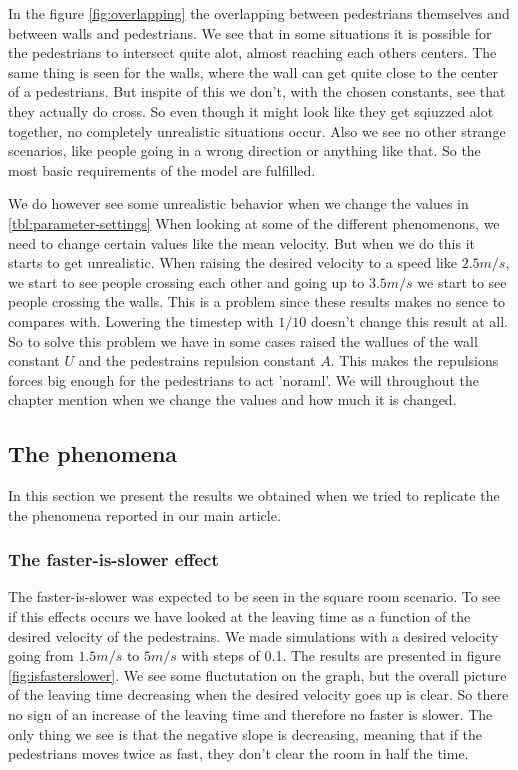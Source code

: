 In the figure \ref{fig:overlapping} the overlapping between pedestrians
themselves and between walls and pedestrians. We see that in some situations
it is possible for the pedestrians to intersect quite alot, almost reaching
each others centers. The same thing is seen for the walls, where the wall
can get quite close to the center of a pedestrians. But inspite of this
we don't, with the chosen constants, see that they actually do cross. So
even though it might look like they get sqiuzzed alot together, no completely
unrealistic situations occur. Also we see no other strange scenarios, like
people going in a wrong direction or anything like that. So the most basic
requirements of the model are fulfilled.

We do however see some unrealistic behavior when we change the values in
\ref{tbl:parameter-settings} When looking at some of the different phenomenons,
we need to change certain values like the mean velocity. But when we do
this it starts to get unrealistic. When raising the desired velocity to
a speed like $2.5m/s$, we start to see people crossing each other and going
up to $3.5m/s$ we start to see people crossing the walls. This is a problem
since these results makes no sence to compares with. Lowering the timestep
with $1/10$ doesn't change this result at all. So to solve this problem we
have in some cases raised the wallues of the wall constant $U$ and the
pedestrains repulsion constant $A$. This makes the repulsions forces
big enough for the pedestrians to act 'noraml'. We will throughout the
chapter mention when we change the values and how much it is changed.

\subsection{The phenomena}\label{subsec:ThePhenomena}
In this section we present the results we obtained when we
tried to replicate the the phenomena reported in our main
article.

\subsubsection{The faster-is-slower effect}
The faster-is-slower was expected to be seen in the square room scenario.
To see if this effects occurs we have looked at the leaving time as a function
of the desired velocity of the pedestrains. We made simulations with a desired velocity
going from $1.5m/s$ to $5m/s$ with steps of 0.1. The results are presented in figure
\ref{fig:isfasterslower}. We see some fluctutation on the graph, but the overall picture
of the leaving time decreasing when the desired velocity goes up is clear. So there no sign of an increase of
the leaving time and therefore no faster is slower. The only thing we see is that the negative slope is decreasing, meaning
 that if the pedestrians moves twice as fast, they don't clear the room in half the time.

